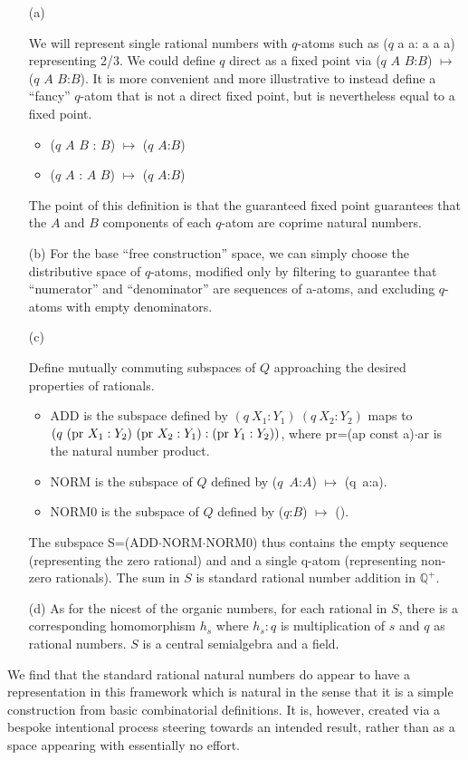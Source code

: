 \documentclass[11pt]{article}
\begin{document}
\begin{itemize} 
\item[(a)] { 
We will represent single rational numbers with $q$-atoms such as ($q$ a a: a a a) representing 2/3.  
We could define $q$ direct as a fixed point via ($q$ $A$ $B$:$B$) $\mapsto$ ($q$ $A$ $B$:$B$).  
It is more convenient and more illustrative to instead define a ``fancy'' $q$-atom that is not a direct fixed point, but is nevertheless equal to a fixed point. 
\begin{itemize}
\item{($q$ $A$ $B$ : $B$) $\mapsto$ ($q$ $A$:$B$)}
\item{($q$ $A$ : $A$ $B$) $\mapsto$ ($q$ $A$:$B$)} 
\end{itemize}
The point of this definition is that the guaranteed fixed point guarantees that the $A$ and $B$ components of each $q$-atom 
are coprime natural numbers.
 }
 \item[(b)] {For the base ``free construction'' space, we can simply choose the distributive space of $q$-atoms, modified only by 
 filtering to guarantee that ``numerator'' and ``denominator'' are sequences of a-atoms, and excluding $q$-atoms with empty denominators. 
}
 \item[(c)] {Define mutually commuting subspaces of $Q$ approaching the desired properties of rationals. 
\begin{itemize}
\item{ADD is the subspace defined by $(q\ X_1:Y_1)\ (q\ X_2:Y_2)$ maps to 
$(q\ ({\rm pr}\ X_1:Y_2)\ ({\rm pr}\ X_2:Y_1) : ({\rm pr}\ Y_1:Y_2))$, where 
pr=(ap const a)$\cdot$ar is the natural number product.}
\item{NORM is the subspace of $Q$ defined by ($q$\ $A$:$A$) $\mapsto$ (q\ a:a).}
\item{NORM0 is the subspace of $Q$ defined by ($q$:$B$) $\mapsto$ ().}  
\end{itemize}
The subspace S=(ADD$\cdot$NORM$\cdot$NORM0) thus contains the empty sequence (representing the zero rational) and 
and a single q-atom (representing non-zero rationals).  The sum in $S$ is standard rational number addition in $\mathbb Q^+$.

 }
 \item[(d)] { 
 As for the nicest of the organic numbers, for each rational in $S$, there is a corresponding homomorphism $h_s$ where $h_s:q$ is multiplication 
of $s$ and $q$ as rational numbers.  $S$ is a central semialgebra and a field.  
 }
 \end{itemize} 
 We find that the standard rational natural numbers do appear to have a representation in this framework which is natural in the sense that 
 it is a simple construction from basic combinatorial definitions.  It is, however, created via a bespoke intentional process steering towards 
 an intended result, rather than as a space appearing with essentially no effort. 
 
\end{document}
